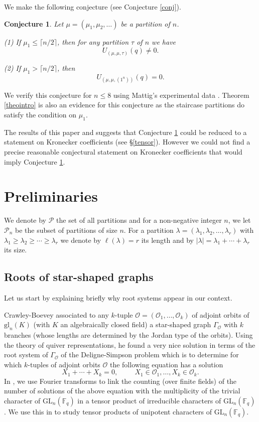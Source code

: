 \documentclass[11pt]{article}
\newtheorem{conj}[theo]{Conjecture}
\theoremstyle{definition}
\numberwithin{equation}{section}
\newcommand{\GL}{\mathrm{GL}}
\newcommand{\calP}{\mathcal{P}}
\newcommand{\F}{\mathbb{F}}
\newcommand{\gl}{\mathrm{gl}}
\begin{document}
We make the following conjecture (see Conjecture \ref{conj}).

\begin{conj} Let $\mu=(\mu_1,\mu_2,\dots)$ be a partition of $n$. 
	
	(1) If $\mu_1\leq \lceil n/2\rceil$, then for any partition $\tau$ of $n$ we have
	$$
	U_{(\mu,\mu,\tau)}(q)\neq 0.
	$$
	
	(2) If $\mu_1>\lceil n/2\rceil$, then 
	$$
	U_{(\mu,\mu,(1^n))}(q)= 0.
	$$
	\label{conj0}\end{conj}

We verify this conjecture for $n\leq 8$ using Mattig's experimental data \cite{Lu}.  Theorem \ref{theointro} is also an evidence for this conjecture as the staircase partitions do satisfy the condition on $\mu_1$. 


The results  of this paper and \cite{L1} suggests that Conjecture \ref{conj0} could be reduced to a statement on Kronecker coefficients (see \S\ref{tensor}). However we could not find a precise reasonable conjectural statement on Kronecker coefficients  that would imply Conjecture \ref{conj0}.

 


\section{Preliminaries}

We denote by $\calP$ the set of all partitions and for a non-negative integer $n$, we let $\calP_n$ be the subset of partitions of size $n$. For a partition $\lambda=(\lambda_1,\lambda_2,\dots,\lambda_r)$ with $\lambda_1\geq\lambda_2\geq\cdots\geq\lambda_r$ we denote by $\ell(\lambda)=r$ its length and by $|\lambda|=\lambda_1+\cdots+\lambda_r$ its size.

\subsection{Roots of star-shaped graphs}\label{ss:roots}

Let us start by explaining briefly why root systems appear in our context.


Crawley-Boevey \cite{CB} associated to any $k$-tuple $\mathcal{O}=(\mathcal{O}_1,\dots,\mathcal{O}_k)$ of adjoint orbits of $\gl_n(K)$ (with $K$ an algebraically closed field) a star-shaped graph $\Gamma_{\mathcal{O}}$ with $k$ branches (whose lengths are determined by the Jordan type of the orbits). Using the theory of quiver representations, he found a very nice solution in terms of the root system of $\Gamma_{\mathcal{O}}$ of the Deligne-Simpson problem which is to determine for which $k$-tuples of adjoint orbits $\mathcal{O}$ the following equation has a solution
$$
X_1+\cdots+X_k=0,\hspace{1cm}X_1\in\mathcal{O}_1,\dots, X_k\in\mathcal{O}_k.
$$
In \cite{hausel-letellier-villegas2}, we use Fourier transforms to link the counting (over finite fields) of the number of solutions of the above equation with the multiplicity of the trivial character of $\GL_n(\F_q)$ in a tensor product of irreducible characters of $\GL_n(\F_q)$. We use this in \cite{L1} to study tensor products of unipotent characters of $\GL_n(\F_q)$.
\end{document}
